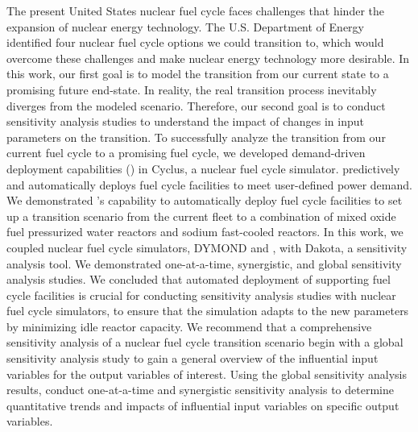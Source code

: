 \vspace{-0.2in}
The present United States nuclear fuel cycle faces challenges that hinder 
the expansion of nuclear energy technology. 
The U.S. Department of Energy identified four nuclear fuel cycle 
options we could transition to, which would overcome these challenges 
and make nuclear energy technology more desirable. 
In this work, our first goal is to model the transition from our current
state to a promising future end-state.
In reality, the real transition process inevitably diverges from the 
modeled scenario. 
Therefore, our second goal is to conduct sensitivity analysis 
studies to understand the impact of changes in input parameters
on the transition. 
To successfully analyze the transition from our current fuel cycle to 
a promising fuel cycle, we developed demand-driven deployment capabilities 
(\deploy) in Cyclus, a nuclear fuel cycle simulator. 
\deploy predictively and automatically deploys fuel cycle facilities 
to meet user-defined power demand.
We demonstrated \deploy's capability to automatically deploy fuel 
cycle facilities to set up a transition scenario from the current 
fleet to a combination of mixed oxide fuel pressurized water reactors 
and sodium fast-cooled reactors. 
In this work, we coupled nuclear fuel cycle simulators, DYMOND 
and \Cyclus, with Dakota, a sensitivity analysis tool. 
We demonstrated 
one-at-a-time, synergistic, and global sensitivity analysis studies.
We concluded that automated deployment of supporting fuel cycle 
facilities is crucial for conducting sensitivity analysis studies 
with nuclear fuel cycle simulators, to ensure that the simulation 
adapts to the new parameters by minimizing idle reactor capacity. 
We recommend that a comprehensive sensitivity analysis of a 
nuclear fuel cycle transition scenario begin with a global 
sensitivity analysis study to gain a general overview of the 
influential input variables for the output variables of interest. 
Using the global sensitivity analysis results, 
conduct one-at-a-time and synergistic sensitivity 
analysis to determine quantitative trends and impacts of influential 
input variables on specific output variables.
